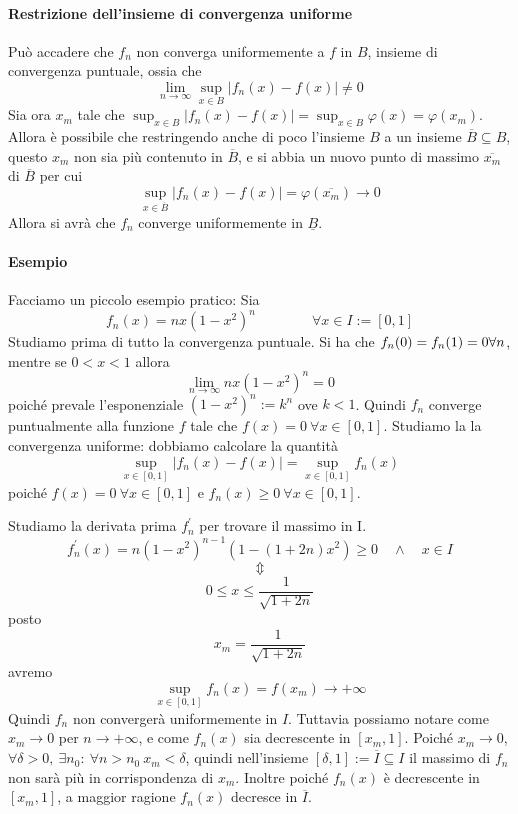 \documentclass[a4paper,12pt]{article}
\begin{document}
\paragraph*{Restrizione dell'insieme di convergenza uniforme}
Può accadere che $f_n$ non converga uniformemente a $f$ in $B$, insieme di convergenza puntuale, ossia che 
$$\lim_{n\to\infty} \sup_{x\in B} |f_n(x)- f(x)|\neq 0$$
Sia ora $x_m$ tale che $\sup_{x\in B} |f_n(x)- f(x)|=\sup_{x\in B} \varphi(x)=\varphi (x_m)$. Allora è possibile che restringendo anche di poco l'insieme $B$ a un insieme $\overline{B}\subseteq B$, questo $x_m$ non sia più contenuto in $\overline{B}$, e si abbia un nuovo punto di massimo $\overline{x_m}$ di $\overline{B}$ per cui 
$$ \sup_{x\in \overline{B}} |f_n(x)- f(x)|=\varphi(\overline{x_m})\to 0 $$
Allora si avrà che $f_n$ converge uniformemente in $\underline{B}$.
\paragraph*{Esempio}
Facciamo un piccolo esempio pratico:
Sia $$f_n(x)= nx(1-x^2)^n \qquad \qquad \forall x\in I:=[0,1]$$
Studiamo prima di tutto la convergenza puntuale.
Si ha che $f_n(0)=f_n(1)=0 \\ \forall n$, mentre se $0<x<1$ allora 
$$\lim_{n\to\infty}nx(1-x^2)^n=0$$
poiché prevale l'esponenziale $(1-x^2)^n:=k^n$ ove $k<1$.
Quindi $f_n $ converge puntualmente alla funzione $f$ tale che $f(x)=0 \ \forall x \in[0,1]$.
Studiamo la la convergenza uniforme: dobbiamo calcolare la quantità
$$\sup_{x\in[0,1]}|f_n(x)-f(x)|=\sup_{x\in[0,1]}f_n(x)$$ 
poiché $f(x)=0 \ \forall x \in [0,1]$ e $f_n(x)\geq0 \ \forall x \in [0,1]$.


Studiamo la derivata prima $f^{'}_n$ per trovare il massimo in I.
\begin{displaymath}
f^{'}_n(x)=n(1-x^2)^{n-1}(1-(1+2n)x^2)\geq 0 \quad \wedge \quad x\in I
\end{displaymath}
$$ \Updownarrow$$
$$0\leq x\leq \frac{1}{\sqrt{1+2n}}$$
posto $$x_m=\frac{1}{\sqrt{1+2n}}$$ avremo
$$\sup_{x\in[0,1]}f_n(x)=f(x_m)\to + \infty$$
Quindi $f_n$ non convergerà uniformemente in $I$.
Tuttavia possiamo notare come $x_m\to 0$ per $n\to + \infty$, e come $f_n(x)$ sia decrescente in $[x_m,1]$.
Poiché $x_m\to 0$, $\forall \delta>0, \ \exists n_0: \ \forall n>n_0 \ x_m<\delta$, quindi nell'insieme $[\delta,1]:=\overline{I}\subseteq I$ il massimo di $f_n$ non sarà più in corrispondenza di $x_m$. Inoltre poiché $f_n(x)$ è decrescente in $[x_m,1]$, a maggior ragione $f_n(x)$ decresce in $\overline{I}$.
\end{document}
